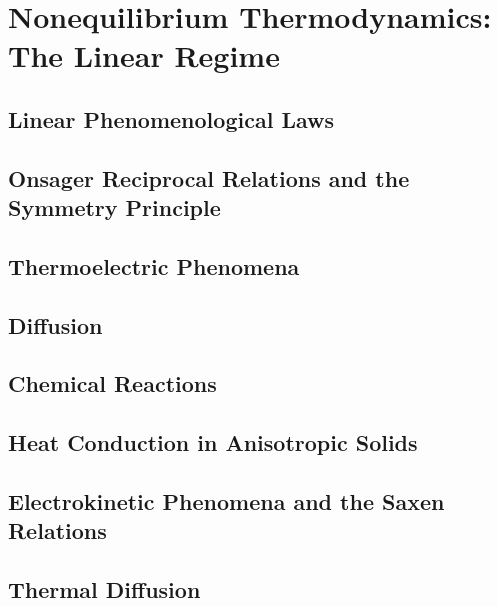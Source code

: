 \chapter{Nonequilibrium Thermodynamics: The Linear Regime}
\section{Linear Phenomenological Laws}
\section{Onsager Reciprocal Relations and the Symmetry Principle}
\section{Thermoelectric Phenomena}
\section{Diffusion}
\section{Chemical Reactions}
\section{Heat Conduction in Anisotropic Solids}
\section{Electrokinetic Phenomena and the Saxen Relations}
\section{Thermal Diffusion}
